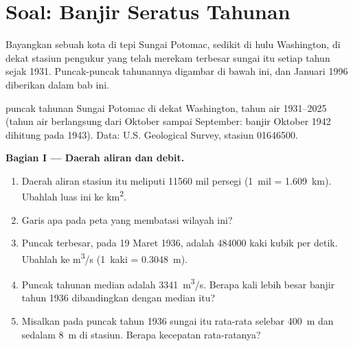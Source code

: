 \section{Soal: Banjir Seratus Tahunan}

\begin{problem}
\label{pb:g10:drainage-basins:1}
Bayangkan sebuah kota di tepi Sungai Potomac, sedikit di hulu Washington, di
dekat stasiun pengukur  yang telah merekam  terbesar sungai itu
setiap tahun sejak 1931. Puncak-puncak tahunannya digambar di bawah ini, dan
 Januari 1996 diberikan dalam bab ini.

\begin{center}

{\small {} puncak tahunan Sungai Potomac di dekat Washington, tahun air
1931--2025 (tahun air berlangsung dari Oktober sampai September: banjir
Oktober 1942 dihitung pada 1943). Data: U.S. Geological Survey, stasiun
01646500.}
\end{center}

\medskip
\noindent\textbf{Bagian I --- Daerah aliran dan debit.}
\begin{enumerate}
  \item Daerah aliran stasiun itu meliputi \num{11560} mil persegi
        (\num{1}~mil = \qty{1.609}{km}). Ubahlah luas ini ke
        \unit{km^2}.
  \item Garis apa pada peta yang membatasi wilayah ini?
  \item Puncak terbesar, pada 19 Maret 1936, adalah \num{484000} kaki kubik
        per detik. Ubahlah ke \unit{m^3/s} (\num{1}~kaki =
        \qty{0.3048}{m}).
  \item Puncak tahunan median adalah \qty{3341}{m^3/s}. Berapa kali lebih
        besar banjir tahun 1936 dibandingkan dengan median itu?
  \item Misalkan pada puncak tahun 1936 sungai itu rata-rata selebar
        \qty{400}{m} dan sedalam \qty{8}{m} di stasiun. Berapa kecepatan
        rata-ratanya?
\end{enumerate}


\end{problem}
